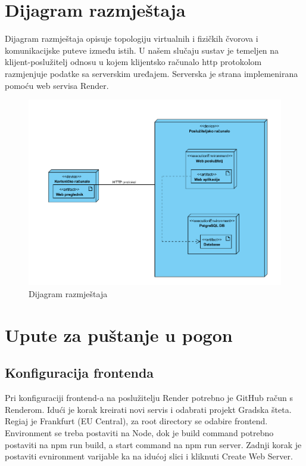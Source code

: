 			\eject 
		
		
		\section{Dijagram razmještaja}
			
			 Dijagram razmještaja opisuje topologiju virtualnih i fizičkih čvorova i komunikacijske puteve između istih. U našem slučaju sustav je temeljen na klijent-poslužitelj odnosu u kojem klijentsko računalo http protokolom razmjenjuje podatke sa serverskim uređajem. Serverska je strana implemenirana pomoću web servisa Render.
			 
			 \begin{figure}[H]
			\includegraphics[scale=0.5]{slike/deploymentDiagram.PNG} %
			\centering
			\caption{Dijagram razmještaja}
			\label{fig:implementacija}
		\end{figure}
			
			\eject 
		
		\section{Upute za puštanje u pogon}
		
			\subsection{Konfiguracija frontenda}
			Pri konfiguraciji frontend-a na poslužitelju Render potrebno je GitHub račun s Renderom. Idući je korak kreirati novi servis i odabrati projekt Gradska šteta. Regiaj je Frankfurt (EU Central), za root directory se odabire frontend. Environment se treba postaviti na Node, dok je build command potrebno postaviti na npm run build, a start command na npm run server. Zadnji korak je postaviti evnironment varijable ka na idućoj slici i kliknuti Create Web Server.
			
